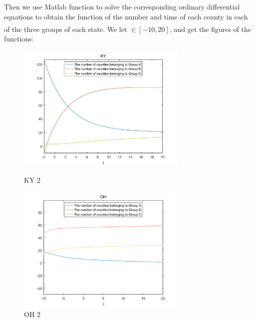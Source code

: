 \documentclass{mcmthesis}
\newcommand{\upcite}[1]{\textsuperscript{\textsuperscript{\cite{#1}}}}
\begin{document}
Then we use Matlab function to solve the corresponding ordinary differential equations to obtain the function of the number and time of each county in each of the three groups of each state\upcite{higham2016matlab}. We let $ \in [ - 10,20]$, and get the figures of the functions:

\begin{figure}[H]
\centering
\begin{minipage}[t]{0.45\textwidth}
\centering
\includegraphics[width=3.2in]{figures/picture/KY_2.jpg}
\caption{KY 2}
\label{KY 2}
\end{minipage}
\hfill
\begin{minipage}[t]{0.45\textwidth}
\centering
\includegraphics[width=3.2in]{figures/picture/OH_2.jpg}
\caption{OH 2}
\label{OH 2}
\end{minipage}
\end{figure}
\end{document}
